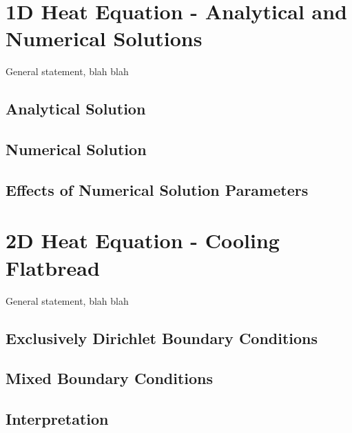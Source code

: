 \documentclass[12pt]{article}
\begin{document}
\clearpage
\section{1D Heat Equation - Analytical and Numerical Solutions}

General statement, blah blah

\subsection{Analytical Solution}

\subsection{Numerical Solution}

\subsection{Effects of Numerical Solution Parameters}

\clearpage
\section{2D Heat Equation - Cooling Flatbread}

General statement, blah blah

\subsection{Exclusively Dirichlet Boundary Conditions}

\subsection{Mixed Boundary Conditions}

\subsection{Interpretation}

\clearpage

\clearpage
\end{document}
